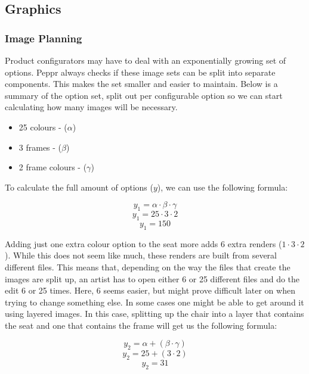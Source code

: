 \subsection{Graphics}

\subsubsection{Image Planning}
Product configurators may have to deal with an exponentially growing set of options. Peppr always checks if these image sets can be split into separate components. This makes the set smaller and easier to maintain. Below is a summary of the option set, split out per configurable option so we can start calculating how many images will be necessary.
\begin{itemize}
	\item 25 colours - (\( \alpha \))
	\item 3 frames - (\( \beta \))
	\item 2 frame colours - (\( \gamma \))
\end{itemize}

To calculate the full amount of options ($y$), we can use the following formula:
 
\[ y_1 = \alpha \cdot \beta \cdot \gamma\]
\[ y_1 = 25 \cdot 3 \cdot 2\]
\[ y_1 = 150\]

Adding just one extra colour option to the seat more adds 6 extra renders ($1 \cdot 3 \cdot 2$). While this does not seem like much, these renders are built from several different files. This means that, depending on the way the files that create the images are split up, an artist has to open either 6 or 25 different files and do the edit 6 or 25 times. Here, 6 seems easier, but might prove difficult later on when trying to change something else.
In some cases one might be able to get around it using layered images. In this case, splitting up the chair into a layer that contains the seat and one that contains the frame will get us the following formula:

\[ y_2 = \alpha + (\beta \cdot \gamma)\]
\[ y_2 = 25 + (3 \cdot 2) \]
\[ y_2 = 31\]

